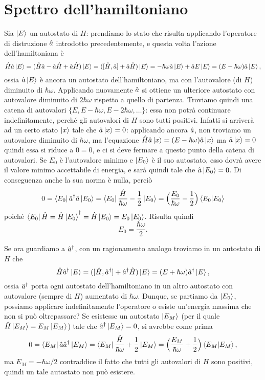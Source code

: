 \section{Spettro dell'hamiltoniano}
Sia $\left|{E}\right\rangle$ un autostato di $H$: prendiamo lo stato che risulta applicando l'operatore di distruzione $\hat{a}$ introdotto precedentemente, e questa volta l'azione dell'hamiltoniana è
\begin{equation}
	\hat{H}\hat{a}\left|{E}\right\rangle=(\hat{H}\hat{a}-\hat{a}\hat{H}+\hat{a}\hat{H})\left|{E}\right\rangle=([\hat{H},\hat{a}]+\hat{a}\hat{H})\left|{E}\right\rangle=-\hbar\omega\hat{a}\left|{E}\right\rangle+\hat{a} E\left|{E}\right\rangle=(E-\hbar\omega)\hat{a}\left|{E}\right\rangle,
\end{equation}
ossia $\hat{a}\left|{E}\right\rangle$ è ancora un autostato dell'hamiltoniano, ma con l'autovalore (di $H$) diminuito di $\hbar\omega$.
Applicando nuovamente $\hat{a}$ si ottiene un ulteriore autostato con autovalore diminuito di $2\hbar\omega$ rispetto a quello di partenza.
Troviamo quindi una catena di autovalori $\{E,E-\hbar\omega,E-2\hbar\omega,\dots\}$: essa non potrà continuare indefinitamente, perch\'e gli autovalori di $H$ sono tutti positivi.
Infatti si arriverà ad un certo stato $\left|{x}\right\rangle$ tale che $\hat{a}\left|{x}\right\rangle=0$: applicando ancora $\hat{a}$, non troviamo un autovalore diminuito di $\hbar\omega$, ma l'equazione	$\hat{H}\hat{a}\left|{x}\right\rangle=(E-\hbar\omega)\hat{a}\left|{x}\right\rangle$ ma $\hat{a}\left|{x}\right\rangle=0$ quindi essa si riduce a $0=0$, e ci si deve fermare a questo punto della catena di autovalori.
Se $E_0$ è l'autovalore minimo e $\left|{E_0}\right\rangle$ è il suo autostato, esso dovrà avere il valore minimo accettabile di energia, e sarà quindi tale che $\hat{a}\left|{E_0}\right\rangle=0$.
Di conseguenza anche la sua norma è nulla, perciò
\begin{equation}
	0=\left\langle{E_0}\right|{\hat{a}}^\dagger\hat{a}\left|{E_0}\right\rangle=\left\langle{E_0}\right|\frac{\hat{H}}{\hbar\omega}-\frac12\left|{E_0}\right\rangle=\Big(\frac{E_0}{\hbar\omega}-\frac12\Big)\left\langle{E_0}\middle|{E_0}\right\rangle
\end{equation}
poich\'e $\left\langle{E_0}\right|\hat{H}={\hat{H}\left|{E_0}\right\rangle}^\dagger=\hat{H}\left|{E_0}\right\rangle=E_0\left|{E_0}\right\rangle$.
Risulta quindi
\begin{equation}
	E_0=\frac{\hbar\omega}2.
	\label{eq:oscillatore-armonico-energia-minima}
\end{equation}

Se ora guardiamo a ${\hat{a}}^\dagger$, con un ragionamento analogo troviamo in un autostato di $H$ che
\begin{equation}
	\hat{H}{\hat{a}}^\dagger\left|{E}\right\rangle=([\hat{H},{\hat{a}}^\dagger]+{\hat{a}}^\dagger\hat{H})\left|{E}\right\rangle=(E+\hbar\omega){\hat{a}}^\dagger\left|{E}\right\rangle,
\end{equation}
ossia ${\hat{a}}^\dagger$ porta ogni autostato dell'hamiltoniano in un altro autostato con autovalore (sempre di $H$) aumentato di $\hbar\omega$.
Dunque, se partiamo da $\left|{E_0}\right\rangle$, possiamo applicare indefinitamente l'operatore o esiste un'energia massima che non si può oltrepassare?
Se esistesse un autostato $\left|{E_M}\right\rangle$ (per il quale $\hat{H}\left|{E_M}\right\rangle=E_M\left|{E_M}\right\rangle$) tale che ${\hat{a}}^\dagger\left|{E_M}\right\rangle=0$, si avrebbe come prima
\begin{equation}
	0=\left\langle{E_M}\right|\hat{a}{\hat{a}}^\dagger\left|{E_M}\right\rangle=\left\langle{E_M}\right|\frac{\hat{H}}{\hbar\omega}+\frac12\left|{E_M}\right\rangle=\Big(\frac{E_M}{\hbar\omega}+\frac12\Big)\left\langle{E_M}\middle|{E_M}\right\rangle,
\end{equation}
ma $E_M=-\hbar\omega/2$ contraddice il fatto che tutti gli autovalori di $H$ sono positivi, quindi un tale autostato non può esistere.

